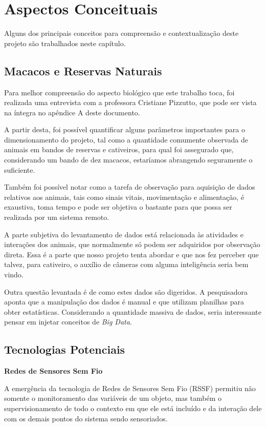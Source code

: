 \chapter{Aspectos Conceituais}
Alguns dos principais conceitos para compreensão e contextualização deste projeto são trabalhados neste capítulo.

\section{Macacos e Reservas Naturais}
Para melhor compreensão do aspecto biológico que este trabalho toca, foi realizada uma entrevista com a professora Cristiane Pizzutto, que pode ser vista na íntegra no apêndice A deste documento.

A partir desta, foi possível quantificar alguns parâmetros importantes para o dimensionamento do projeto, tal como a quantidade comumente observada de animais em bandos de reservas e cativeiros, para qual foi assegurado que, considerando um bando de dez macacos, estaríamos abrangendo seguramente o suficiente.

Também foi possível notar como a tarefa de observação para aquisição de dados relativos aos animais, tais como sinais vitais, movimentação e alimentação, é exaustiva, toma tempo e pode ser objetiva o bastante para que possa ser realizada por um sistema remoto.

A parte subjetiva do levantamento de dados está relacionada às atividades e interações dos animais, que normalmente só podem ser adquiridos por observação direta. Essa é a parte que nosso projeto tenta abordar e que nos fez perceber que talvez, para cativeiro, o auxílio de câmeras com alguma inteligência seria bem vindo.

Outra questão levantada é de como estes dados são digeridos. A pesquisadora aponta que a manipulação dos dados é manual e que utilizam planilhas para obter estatísticas. Considerando a quantidade massiva de dados, seria interessante pensar em injetar conceitos de \emph{Big Data}.

\section{Tecnologias Potenciais}
\textbf{Redes de Sensores Sem Fio}

A emergência da tecnologia de Redes de Sensores Sem Fio (RSSF) permitiu não somente o monitoramento das variáveis de um objeto, mas também o supervisionamento de todo o contexto em que ele está incluído e da interação dele com os demais pontos do sistema sendo sensoriados.

